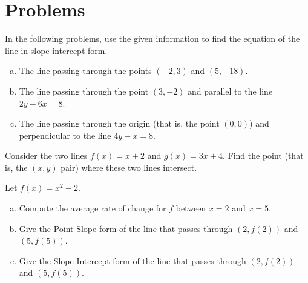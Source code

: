 \documentclass[12pt]{amsart}
\begin{document}
\newpage
\section{Problems}

\begin{thm}[16 Points]\label{ex5}
  In the following problems, use the given information to find the equation of the line in slope-intercept form.
  \begin{enumerate}[(a)]
  \item
    The line passing through the points $(-2,3)$ and $(5,-18)$.
    \vspace{1in}
  \item
    The line passing through the point $(3, -2)$ and parallel to the line $2y - 6x = 8$.
    \vspace{1in}
  \item
    The line passing through the origin (that is, the point $(0,0)$) and perpendicular to the line $4y - x = 8$.
    \vspace{1in}
  \end{enumerate}
  \vspace{1in}
\end{thm}


\begin{thm}[16 Points]\label{ex10}
  Consider the two lines $f(x) = x + 2$ and $g(x) = 3x + 4$.
  Find the point (that is, the $(x,y)$ pair) where these two lines intersect.
  \vspace{2in}
\end{thm}

\newpage

\begin{thm}[16 Points]\label{ex9}
  Let $f(x) = x^2 - 2$.
  \begin{enumerate}[(a)]
  \item
    Compute the average rate of change for $f$ between $x = 2$ and $x = 5$.
    \vspace{2in}
  \item
    Give the Point-Slope form of the line that passes through $(2, f(2))$ and $(5, f(5))$.
    \vspace{2in}
  \item
    Give the Slope-Intercept form of the line that passes through $(2, f(2))$ and $(5, f(5))$.
  \end{enumerate}
\end{thm}

\newpage
\end{document}
